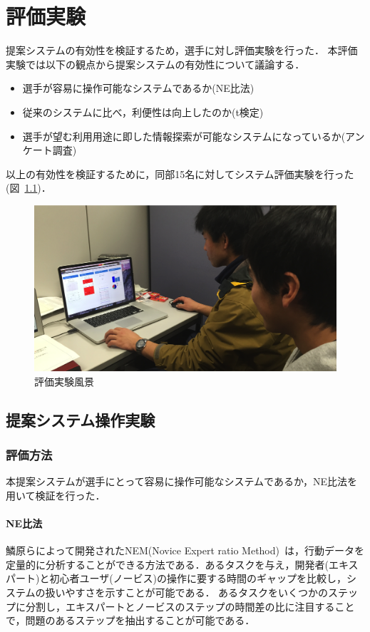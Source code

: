 \documentclass[sotsuron]{kuee}
\begin{document}
\chapter{評価実験}
	提案システムの有効性を検証するため，選手に対し評価実験を行った．
	本評価実験では以下の観点から提案システムの有効性について議論する．
	\begin{itemize}
		\item 選手が容易に操作可能なシステムであるか(NE比法)
		\item 従来のシステムに比べ，利便性は向上したのか(t検定)
		\item 選手が望む利用用途に即した情報探索が可能なシステムになっているか(アンケート調査)
	\end{itemize}
	以上の有効性を検証するために，同部15名に対してシステム評価実験を行った(図~\ref{fig:experi})．
		\begin{figure}
			\begin{center}
				\includegraphics[width=\linewidth]{./png/experience.png}
			\end{center}
			\caption{評価実験風景}
	  		\label{fig:experi}
		\end{figure}

	\section{提案システム操作実験}
		\subsection{評価方法}
			本提案システムが選手にとって容易に操作可能なシステムであるか，NE比法を用いて検証を行った．
				\subsubsection{NE比法}
					鱗原らによって開発されたNEM(Novice Expert ratio Method)~\cite{NEM}は，行動データを定量的に分析することができる方法である．あるタスクを与え，開発者(エキスパート)と初心者ユーザ(ノービス)の操作に要する時間のギャップを比較し，システムの扱いやすさを示すことが可能である．
					あるタスクをいくつかのステップに分割し，エキスパートとノービスのステップの時間差の比に注目することで，問題のあるステップを抽出することが可能である．
\end{document}

